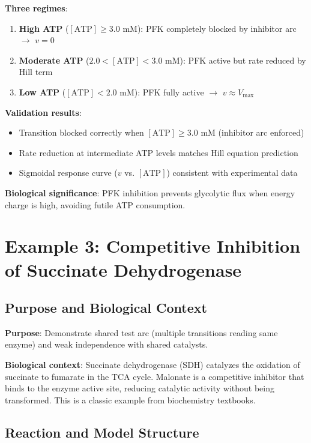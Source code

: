 \textbf{Three regimes}:

\begin{enumerate}
    \item \textbf{High ATP} ($[\text{ATP}] \geq 3.0$ mM): PFK completely blocked by inhibitor arc $\to$ $v = 0$
    \item \textbf{Moderate ATP} ($2.0 < [\text{ATP}] < 3.0$ mM): PFK active but rate reduced by Hill term
    \item \textbf{Low ATP} ($[\text{ATP}] < 2.0$ mM): PFK fully active $\to$ $v \approx V_{\max}$
\end{enumerate}

\textbf{Validation results}:

\begin{itemize}
    \item Transition blocked correctly when $[\text{ATP}] \geq 3.0$ mM (inhibitor arc enforced)
    \item Rate reduction at intermediate ATP levels matches Hill equation prediction
    \item Sigmoidal response curve ($v$ vs. $[\text{ATP}]$) consistent with experimental data
\end{itemize}

\textbf{Biological significance}: PFK inhibition prevents glycolytic flux when energy charge is high, avoiding futile ATP consumption.

\section{Example 3: Competitive Inhibition of Succinate Dehydrogenase}
\label{sec:example-competitive}

\subsection{Purpose and Biological Context}
\label{subsec:comp-purpose}

\textbf{Purpose}: Demonstrate shared test arc (multiple transitions reading same enzyme) and weak independence with shared catalysts.

\textbf{Biological context}: Succinate dehydrogenase (SDH) catalyzes the oxidation of succinate to fumarate in the TCA cycle. Malonate is a competitive inhibitor that binds to the enzyme active site, reducing catalytic activity without being transformed. This is a classic example from biochemistry textbooks.

\subsection{Reaction and Model Structure}
\label{subsec:comp-structure}

